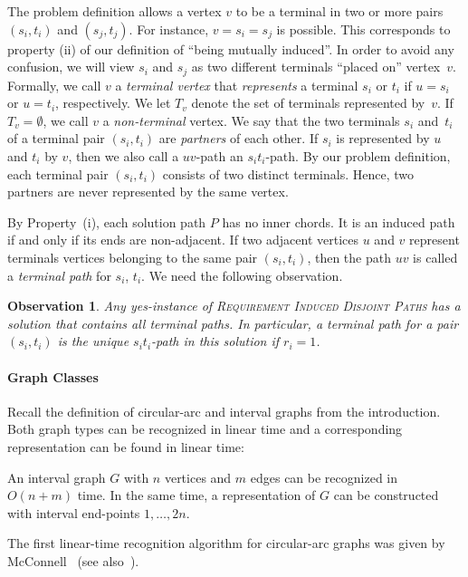 \documentclass{llncs}
\newtheorem{observation}{Observation}
\newcommand{\problemRIDP}{\textsc{Requirement Induced Disjoint Paths}}
\begin{document}
The problem definition allows a vertex $v$ to be a terminal in two or more pairs $(s_i,t_i)$ and $(s_j,t_j)$. For instance, $v=s_i=s_j$ is possible.
This corresponds to property (ii) of our definition of ``being mutually induced''. 
In order to avoid any confusion, we will view $s_i$ and $s_j$ as two different terminals ``placed on'' vertex~$v$.
Formally, we call $v$ a {\em terminal vertex} that
{\em represents} a terminal $s_i$ or $t_i$ if $u=s_i$ or $u=t_i$, respectively.
We let $T_v$  denote the set of terminals represented by~$v$. If $T_v=\emptyset$, we call $v$ a {\em non-terminal} vertex. 
We say that the two terminals $s_i$ and~$t_i$ of a terminal pair $(s_i,t_i)$ are {\em partners} of each other. 
If $s_i$ is represented by $u$ and $t_i$ by $v$, then we also call a $uv$-path an $s_it_i$-path.
By our problem definition, each terminal pair $(s_i,t_i)$ consists of two distinct terminals. Hence, two partners are never represented by the same vertex.

By Property~(i), each solution path $P$  has no inner chords. It is an induced path if and only if its ends are non-adjacent.
If two adjacent vertices $u$ and $v$ represent terminals vertices belonging to the same pair $(s_i,t_i)$, then the path $uv$ is called
a {\em terminal path} for $s_i$, $t_i$.
We need the following observation.

\begin{observation}\label{o-trivial}
Any yes-instance of \problemRIDP{} has a solution that contains 
all terminal paths. In particular, a terminal path for a pair $(s_i,t_i)$ is the unique $s_it_i$-path in this solution if $r_i=1$.
\end{observation}

\paragraph{Graph Classes}
Recall the definition of circular-arc and interval graphs from the introduction. Both graph types can be recognized in linear time and a corresponding representation can be found in linear time:

\begin{theorem}\label{t-bl}
An interval graph $G$ with $n$ vertices and $m$ edges can be recognized in $O(n+m)$ time. In the same time, a representation of $G$ can be constructed with interval end-points 
$1,\ldots,2n$.   
\end{theorem}

The first linear-time recognition algorithm for circular-arc graphs was given by McConnell~\cite{M2003} (see also~\cite{KaplanN11}).
\end{document}
